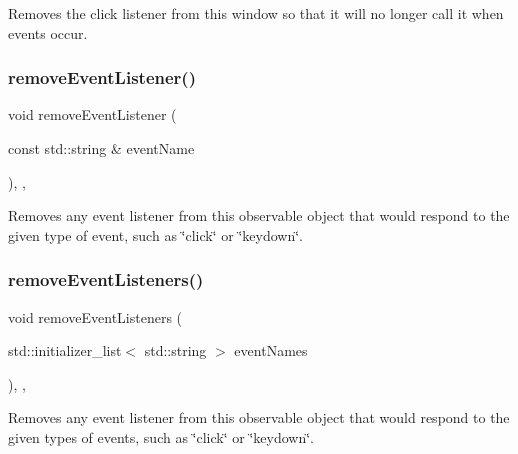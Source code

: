 Removes the click listener from this window so that it will no longer call it when events occur. 

\mbox{\label{classGObservable_acbcf1ed3a851ad8a3c17ef38d86b481d}} 
\subsubsection{\texorpdfstring{remove\+Event\+Listener()}{removeEventListener()}}
{\footnotesize\ttfamily void remove\+Event\+Listener (\begin{DoxyParamCaption}\item[{const std\+::string \&}]{event\+Name }\end{DoxyParamCaption})\hspace{0.3cm}{\ttfamily [protected]}, {\ttfamily [virtual]}, {\ttfamily [inherited]}}



Removes any event listener from this observable object that would respond to the given type of event, such as \char`\"{}click\char`\"{} or \char`\"{}keydown\char`\"{}. 

\mbox{\label{classGObservable_af51cc35c29a1bd1908609d432decdbb6}} 
\subsubsection{\texorpdfstring{remove\+Event\+Listeners()}{removeEventListeners()}}
{\footnotesize\ttfamily void remove\+Event\+Listeners (\begin{DoxyParamCaption}\item[{std\+::initializer\+\_\+list$<$ std\+::string $>$}]{event\+Names }\end{DoxyParamCaption})\hspace{0.3cm}{\ttfamily [protected]}, {\ttfamily [virtual]}, {\ttfamily [inherited]}}



Removes any event listener from this observable object that would respond to the given types of events, such as \char`\"{}click\char`\"{} or \char`\"{}keydown\char`\"{}. 

